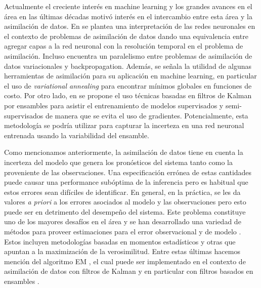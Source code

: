 Actualmente el creciente interés en machine learning y los grandes avances en el área en las últimas décadas motivó interés en el intercambio entre esta área y la asimilación de datos. En \cite{Abarbanel2018} se plantea una interpretación de las redes neuronales en el contexto de problemas de asimilación de datos dando una equivalencia entre agregar capas a la red neuronal con la resolución temporal en el problema de asimilación. Incluso encuentra un paralelismo entre problemas de asimilación de datos variacionales y backpropagation. Además, se señala la utilidad de algunas herramientas de asimilación para su aplicación en machine learning, en particular el uso de \textit{variational annealing} para encontrar mínimos globales en funciones de costo. Por otro lado, en \cite{Kovachki2019} se propone el uso técnicas basadas en filtros de Kalman por ensambles para asistir el entrenamiento de modelos supervisados y semi-supervisados de manera que se evita el uso de gradientes. Potencialmente, esta metodología se podría utilizar para capturar la incerteza en una red neuronal entrenada usando la variabilidad del ensamble.

Como mencionamos anteriormente, la asimilación de datos tiene en cuenta la incerteza del modelo que genera los pronósticos del sistema tanto como la proveniente de las observaciones. Una especificación errónea de estas cantidades puede causar una performance subóptima de la inferencia pero es habitual que estos errores sean difíciles de identificar. En general, en la práctica, se les da valores \textit{a priori} a los errores asociados al modelo y las observaciones pero esto puede ser en detrimento del desempeño del sistema. Este problema constituye uno de los mayores desafíos en el área y se han desarrollado una variedad de métodos para proveer estimaciones para el error observacional y de modelo \citep{Tandeo2020}. Estos incluyen metodologías basadas en momentos estadísticos y otras que apuntan a la maximización de la verosimilitud. Entre estas últimas hacemos mención del algoritmo EM \citep{Dempster1977}, el cual puede ser implementado en el contexto de asimilación de datos con filtros de Kalman y en particular con filtros basados en ensambles \citep{Tandeo2015}.

